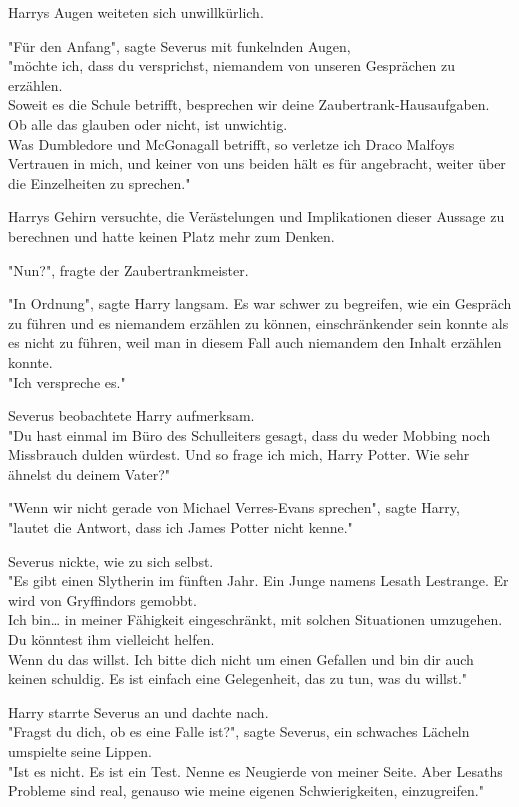 {Harrys Augen weiteten sich unwillkürlich.

"Für den Anfang", sagte Severus mit funkelnden Augen,\\ "möchte ich, dass du versprichst, niemandem von unseren Gesprächen zu erzählen.\\ Soweit es die Schule betrifft, besprechen wir deine Zaubertrank-Hausaufgaben. Ob alle das glauben oder nicht, ist unwichtig.\\ Was Dumbledore und McGonagall betrifft, so verletze ich Draco Malfoys Vertrauen in mich, und keiner von uns beiden hält es für angebracht, weiter über die Einzelheiten zu sprechen."

Harrys Gehirn versuchte, die Verästelungen und Implikationen dieser Aussage zu berechnen und hatte keinen Platz mehr zum Denken.

"Nun?", fragte der Zaubertrankmeister.

"In Ordnung", sagte Harry langsam. Es war schwer zu begreifen, wie ein Gespräch zu führen und es niemandem erzählen zu können, einschränkender sein konnte als es nicht zu führen, weil man in diesem Fall auch niemandem den Inhalt erzählen konnte.\\ "Ich verspreche es."

Severus beobachtete Harry aufmerksam.\\ "Du hast einmal im Büro des Schulleiters gesagt, dass du weder Mobbing noch Missbrauch dulden würdest. Und so frage ich mich, Harry Potter. Wie sehr ähnelst du deinem Vater?"

"Wenn wir nicht gerade von Michael Verres-Evans sprechen", sagte Harry,\\ "lautet die Antwort, dass ich James Potter nicht kenne."

Severus nickte, wie zu sich selbst.\\ "Es gibt einen Slytherin im fünften Jahr. Ein Junge namens Lesath Lestrange. Er wird von Gryffindors gemobbt.\\ Ich bin… in meiner Fähigkeit eingeschränkt, mit solchen Situationen umzugehen. Du könntest ihm vielleicht helfen.\\ Wenn du das willst. Ich bitte dich nicht um einen Gefallen und bin dir auch keinen schuldig. Es ist einfach eine Gelegenheit, das zu tun, was du willst."

Harry starrte Severus an und dachte nach.\\ "Fragst du dich, ob es eine Falle ist?", sagte Severus, ein schwaches Lächeln umspielte seine Lippen.\\ "Ist es nicht. Es ist ein Test. Nenne es Neugierde von meiner Seite. Aber Lesaths Probleme sind real, genauso wie meine eigenen Schwierigkeiten, einzugreifen."

}

